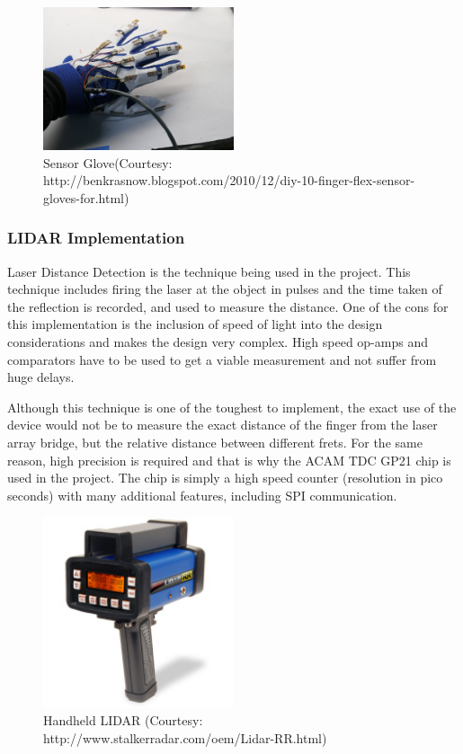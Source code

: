 \documentclass[11pt]{article}
\begin{document}
\begin{figure}[!h]
\centering
\includegraphics[width=0.5\textwidth]{glove.jpg}
\caption{Sensor Glove(Courtesy: http://benkrasnow.blogspot.com/2010/12/diy-10-finger-flex-sensor-gloves-for.html)}
\label{glove}
\end{figure}


\subsubsection{LIDAR Implementation}

Laser Distance Detection is the technique being used in the project. This technique includes firing the laser at the object in pulses and the time taken of the reflection is recorded, and used to measure the distance. One of the cons for this implementation is the inclusion of speed of light into the design considerations and makes the design very complex. High speed op-amps and comparators have to be used to get a viable measurement and not suffer from huge delays. 

Although this technique is one of the toughest to implement, the exact use of the device would not be to measure the exact distance of the finger from the laser array bridge, but the relative distance between different frets. For the same reason, high precision is required and that is why the ACAM TDC GP21 chip is used in the project. The chip is simply a high speed counter (resolution in pico seconds) with many additional features, including SPI communication. 

\begin{figure}[!h]
\centering
\includegraphics[width=0.5\textwidth]{lidar.jpg}
\caption{Handheld LIDAR (Courtesy: http://www.stalkerradar.com/oem/Lidar-RR.html)}
\label{lidar}
\end{figure}
\end{document}
